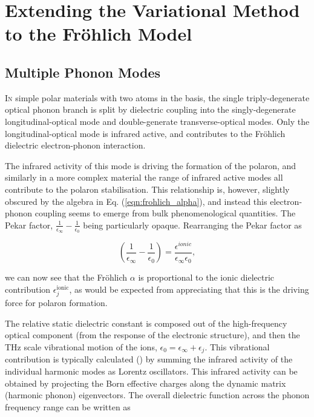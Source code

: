 \clearpage{}

\pagestyle{body}

\chapter{Extending the Variational Method to the Fr\"ohlich Model}
\label{chap:third}



\section{Multiple Phonon Modes}
\label{sec:chap-third-first}

\lettrine{I}n simple polar materials with two atoms in the basis, the single triply-degenerate optical phonon branch is split by dielectric coupling into the singly-degenerate longitudinal-optical mode and double-generate transverse-optical modes. Only the longitudinal-optical mode is infrared active, and contributes to the Fr\"ohlich dielectric electron-phonon interaction. 

The infrared activity of this mode is driving the formation of the polaron, and similarly in a more complex material the range of infrared active modes all contribute to the polaron stabilisation. This relationship is, however, slightly obscured by the algebra in Eq. (\ref{eqn:frohlich_alpha}), and instead this electron-phonon coupling seems to emerge from bulk phenomenological quantities. The Pekar factor, $\frac{1}{\epsilon_{\infty}}-\frac{1}{\epsilon_{0}}$ being particularly opaque. Rearranging the Pekar factor as

\begin{equation}
    \left( \frac{1}{\epsilon_{\infty}} - \frac{1}{\epsilon_{0}} \right) = \frac{\epsilon^{ionic}}{\epsilon_{\infty}\epsilon_{0}},
    \label{eqn:pekar}
\end{equation}

we can now see that the Fr\"ohlich $\alpha$ is proportional to the ionic dielectric contribution $\epsilon^{\text{ionic}}_j$, as would be expected from appreciating that this is the driving force for polaron formation. 

The relative static dielectric constant is composed out of the high-frequency optical component (from the response of the electronic structure), and then the THz scale vibrational motion of the ions, $\epsilon_{0}=\epsilon_{\infty}+\epsilon_{j}$. This vibrational contribution is typically calculated (\cite{gonze_dynamical_1997}) by summing the infrared activity of the individual harmonic modes as Lorentz oscillators. This infrared activity can be obtained by projecting the Born effective charges along the dynamic matrix (harmonic phonon) eigenvectors. The overall dielectric function across the phonon frequency range can be written as 


